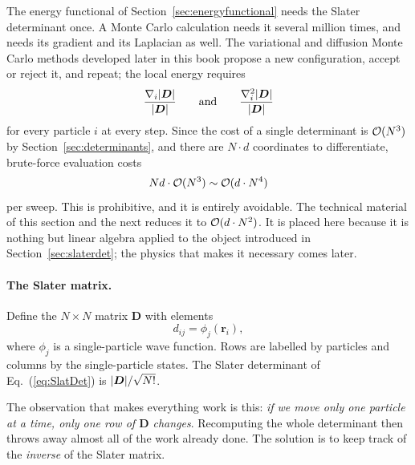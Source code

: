 The energy functional of Section~\ref{sec:energyfunctional} needs the Slater
determinant once.  A Monte Carlo calculation needs it several million times,
and needs its gradient and its Laplacian as well.  The variational and
diffusion Monte Carlo methods developed later in this book propose a new
configuration, accept or reject it, and repeat; the local energy requires
\begin{equation}
  \frac{\nabla_i{|\boldsymbol{D}|}}{{|\boldsymbol{D}|}}
  \qquad\text{and}\qquad
  \frac{\nabla_i^2{|\boldsymbol{D}|}}{{|\boldsymbol{D}|}}
  \label{eq:2-gradlapratio}
\end{equation}
for every particle $i$ at every step.  Since the cost of a single
determinant is $\mathcal{O}(N^3)$ by Section~\ref{sec:determinants}, and there are
$N\cdot d$ coordinates to differentiate, brute-force evaluation costs
\begin{equation}
  N d\cdot\mathcal{O}(N^3) \sim \mathcal{O}(d\cdot N^4)
  \label{eq:2-bruteforce}
\end{equation}
per sweep.  This is prohibitive, and it is entirely avoidable.  The technical
material of this section and the next reduces it to $\mathcal{O}(d\cdot N^2)$.  It
is placed here because it is nothing but linear algebra applied to the object
introduced in Section~\ref{sec:slaterdet}; the physics that makes it necessary
comes later.

\paragraph{The Slater matrix.}
Define the $N\times N$ matrix $\bm{D}$ with elements
\begin{equation}
  d_{ij} = \phi_j(\bm{r}_i),
  \label{eq:2-slatermatrix}
\end{equation}
where $\phi_j$ is a single-particle wave function.  Rows are labelled by
particles and columns by the single-particle states.  The Slater determinant
of Eq.~(\ref{eq:SlatDet}) is ${|\boldsymbol{D}|}/\sqrt{N!}$.

The observation that makes everything work is this: \emph{if we move only one
particle at a time, only one row of $\bm{D}$ changes}.  Recomputing the whole
determinant then throws away almost all of the work already done.  The
solution is to keep track of the \emph{inverse} of the Slater matrix.

